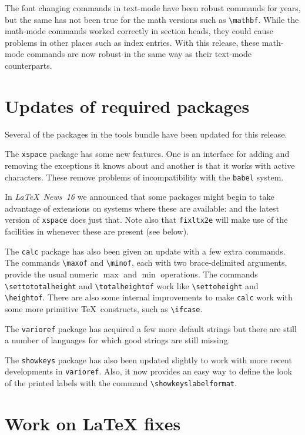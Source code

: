 \documentclass{ltnews}
\providecommand\pkg[1]{\texttt{#1}}
\begin{document}
The font changing commands in text-mode have been robust commands for years,
but the same has not been true for the math versions such as
\verb|\mathbf|.  While the math-mode commands worked correctly in
section heads, they could cause problems in other places such as index
entries.  With this release, these math-mode commands are now robust in
the same way as their text-mode counterparts.

\pagebreak


\section{Updates of required packages}

Several of the packages in the \textsf{tools} bundle have been updated
for this release.

The \pkg{xspace} package has some new features.  One is an
interface for adding and removing the exceptions it knows about and
another is that it works with active characters. These remove problems
of incompatibility with the \pkg{babel} system.

In \textit{\LaTeX\ News~16} we announced that some packages might
begin to take advantage of \eTeX{} extensions on systems where these
are available: and the latest version of \pkg{xspace} does just
that.  Note also that \pkg{fixltx2e} will make use of the
facilities in \eTeX{} whenever these are present (see below).

The \pkg{calc} package has also been given an update with a few
extra commands.
The commands \verb|\maxof| and \verb|\minof|, each with two
brace-delimited arguments, provide the usual numeric $\max$ and $\min$
operations. The commands \verb|\settototalheight| and
\verb|\totalheightof| work like \verb|\settoheight| and
\verb|\heightof|.  There are also some internal improvements to make
\pkg{calc} work with some more primitive \TeX\ constructs, such as
\verb|\ifcase|.

The \pkg{varioref} package has acquired a few more default
strings but there are still a number of languages for
which good strings are still missing.

The \pkg{showkeys} package has also been updated slightly to work
with more recent developments in \pkg{varioref}. Also, it now
provides an easy way to define the look of the printed labels with
the command \verb|\showkeyslabelformat|.

\section{Work on \LaTeX{} fixes}
\end{document}
